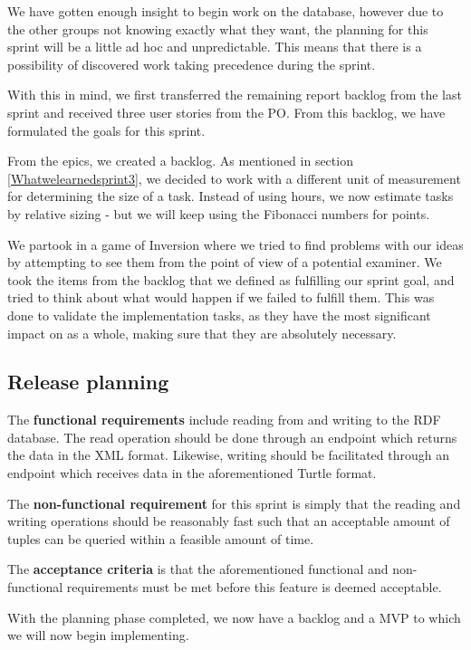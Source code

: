 We have gotten enough insight to begin work on the database, however due to the other groups not knowing exactly what they want, the planning for this sprint will be a little ad hoc and unpredictable.  
This means that there is a possibility of discovered work taking precedence during the sprint.

With this in mind, we first transferred the remaining report backlog from the last sprint and received three user stories from the PO. 
From this backlog, we have formulated the goals for this sprint.

From the epics, we created a backlog. As mentioned in section \ref{Whatwelearnedsprint3}, we decided to work with a different unit of measurement for determining the size of a task.
Instead of using hours, we now estimate tasks by relative sizing - but we will keep using the Fibonacci numbers for points.

We partook in a game of Inversion \cite{InversionThinking} where we tried to find problems with our ideas by attempting to see them from the point of view of a potential examiner. 
We took the items from the backlog that we defined as fulfilling our sprint goal, and tried to think about what would happen if we failed to fulfill them. 
This was done to validate the implementation tasks, as they have the most significant impact on \knox{} as a whole, making sure that they are absolutely necessary. 

\subsection*{Release planning}
The \textbf{functional requirements} include reading from and writing to the RDF database. 
The read operation should be done through an endpoint which returns the data in the XML format.
Likewise, writing should be facilitated through an endpoint which receives data in the aforementioned Turtle format.


The \textbf{non-functional requirement} for this sprint is simply that the reading and writing operations should be reasonably fast such that an acceptable amount of tuples can be queried within a feasible amount of time.


The \textbf{acceptance criteria} is that the aforementioned functional and non-functional requirements must be met before this feature is deemed acceptable. 


With the planning phase completed, we now have a backlog and a MVP to which we will now begin implementing.